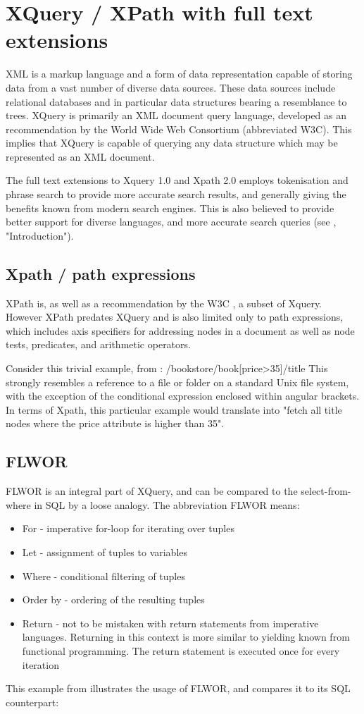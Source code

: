 \section{XQuery / XPath with full text extensions}
\label{sect:theory:xquery}
XML is a markup language and a form of data representation capable of storing data from a vast number of diverse data sources. These data sources include relational databases and in particular data structures bearing a resemblance to trees. XQuery is primarily an XML document query language, developed as an recommendation by the World Wide Web Consortium\cite{w3c00} (abbreviated W3C). This implies that XQuery is capable of querying any data structure which may be represented as an XML document.

The full text extensions to Xquery 1.0 and Xpath 2.0 employs tokenisation and phrase search to provide more accurate search results, and generally giving the benefits known from modern search engines. This is also believed to provide better support for diverse languages, and more accurate search queries (see \cite{w3c02}, "Introduction").

\subsection{Xpath / path expressions}
XPath is, as well as a recommendation by the W3C \cite{w3c01}, a subset of Xquery. However XPath predates XQuery and is also limited only to path expressions, which includes axis specifiers for addressing nodes in a document as well as node tests, predicates, and arithmetic operators.

Consider this trivial example, from \cite{w3s00}:
/bookstore/book[price>35]/title
This strongly resembles a reference to a file or folder on a standard Unix file system, with the exception of the conditional expression enclosed within angular brackets. In terms of Xpath, this particular example would translate into "fetch all title nodes where the price attribute is higher than 35".

\subsection{FLWOR}
FLWOR is an integral part of XQuery, and can be compared to the select-from-where in SQL by a loose analogy. The abbreviation FLWOR means:
\begin{itemize}
\item For - imperative for-loop for iterating over tuples
\item Let - assignment of tuples to variables
\item Where - conditional filtering of tuples
\item Order by - ordering of the resulting tuples
\item Return - not to be mistaken with return statements from imperative languages. Returning in this context is more similar to yielding known from functional programming. The return statement is executed once for every iteration
\end{itemize}
This example from \cite{styl00} illustrates the usage of FLWOR, and compares it to its SQL counterpart:


